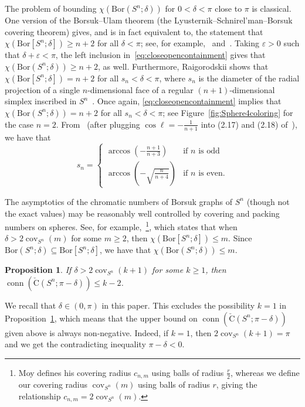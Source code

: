 \documentclass[11 pt,a4paper,twoside,reqno]{amsart}
\newtheorem{proposition}[theorem]{Proposition}
\theoremstyle{definition}
\newcommand{\cech}[2]{\mathrm{\check{C}}(#1;#2)}
\DeclareMathOperator{\conn}{conn}
\DeclareMathOperator{\cov}{cov}
\newcommand{\bor}[2]{\mathrm{Bor}(#1;#2)}
\newcommand{\cbor}[2]{\mathrm{Bor}[#1;#2]}
\newcommand{\sucharita}[1]{{\textcolor{magenta} {#1}}}
\begin{document}
The problem of bounding $\chi(\bor{S^n}{\delta})$ for $0<\delta<\pi$ close to $\pi$ is classical.
One version of the Borsuk--Ulam theorem (the Lyusternik--Schnirel'man--Borsuk covering theorem) gives, and is in fact equivalent to, the statement that $\chi(\cbor{S^n}{\delta})\ge n+2$ for all $\delta<\pi$; see, for example,~\cite{borsuk1933drei,lovasz1983self,barany1978short} and~\cite[Section~2.1, Exercise~10]{matousek2003using}.
Taking $\varepsilon > 0$ such that $\delta + \varepsilon < \pi$, the left inclusion in~\eqref{eq:closeopencontainment} gives that $\chi(\bor{S^n}{\delta})\ge n+2$, as well.
Furthermore, Raigorodskii shows that $\chi(\cbor{S^n}{\delta})=n+2$ for all $s_n<\delta<\pi$, where $s_n$ is the diameter of the radial projection of a single $n$-dimensional face of a regular $(n+1)$-dimensional simplex inscribed in $S^n$~\cite{raigorodskii2010chromatic, raigorodskii2012chromatic}.
Once again, \eqref{eq:closeopencontainment} implies that $\chi(\bor{S^n}{\delta})=n+2$ for all $s_n<\delta<\pi$; see Figure~\ref{fig:Sphere4coloring} for the case $n=2$.
From~\cite{santalo1946convex} (after plugging $\cos \ell=-\frac{1}{n+1}$ into (2.17) and (2.18) of~\cite{santalo1946convex}), we have that
\[s_n=\begin{cases} 
\arccos{\left(-\frac{n+1}{n+3}\right)} & \text{if }n \text{ is odd} \\
\arccos{\left(-\sqrt{\frac{n}{n+4}}\right)} &  \text{if }n \text{ is even}.
\end{cases}\]

The asymptotics of the chromatic numbers of Borsuk graphs of $S^n$ (though not the exact values) may be reasonably well controlled by covering and packing numbers on spheres.
See, for example,~\cite[Theorem 5.1.5]{MoyPhD}\footnote{
Moy defines his covering radius $c_{n,m}$ using balls of radius $\frac{r}{2}$, whereas we define our covering radius $\cov_{S^n}(m)$ using balls of radius $r$, giving the relationship $c_{n,m}=2\cov_{S^n}(m)$.},
which states that when $\delta > 2\cov_{S^n}(m)$ for some $m \ge 2$, then $\chi(\cbor{S^n}{\delta}) \le m$.
Since $\bor{S^n}{\delta}\subseteq \cbor{S^n}{\delta}$, we have that $\chi(\bor{S^n}{\delta}) \le m$.

\begin{proposition}
\label{prop:upper}
If $\delta > 2\cov_{S^n}(k+1)$ for some $k \ge 1$, then $\conn(\cech{S^n}{\pi-\delta}) \le k-2$.
\end{proposition}

{We recall that $\delta\in (0,\pi)$ in this paper. This excludes the possibility $k=1$ in Proposition~\ref{prop:upper}, which means that the upper bound on $\conn(\cech{S^n}{\pi-\delta})$ given above is always non-negative. 
Indeed, if $k=1$, then $2\cov_{S^n}(k+1)=\pi$ and we get the contradicting inequality $\pi-\delta<0$.}
%
\end{document}
